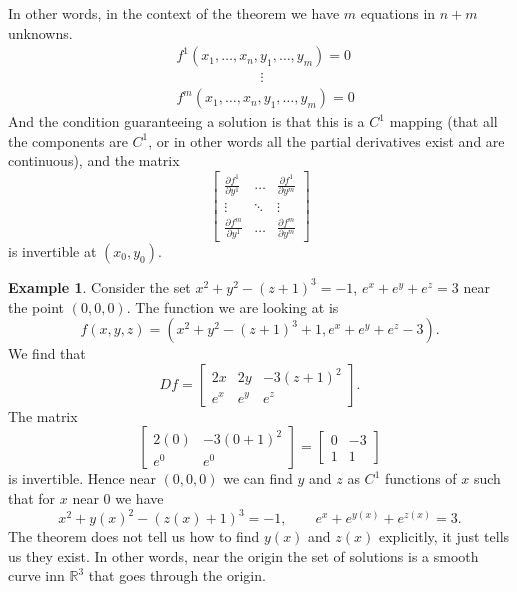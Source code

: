 \documentclass[12pt]{book}
\newcommand{\R}{{\mathbb{R}}}
\theoremstyle{plain}
\theoremstyle{remark}
\theoremstyle{definition}
\theoremstyle{exercise}
\theoremstyle{example}
\newtheorem{example}[thm]{Example}
\begin{document}
In other words, in the context of the theorem we have
$m$ equations in $n+m$ unknowns.
\begin{align*}
& f^1 (x_1,\ldots,x_n,y_1,\ldots,y_m) = 0 \\
& \qquad \qquad \qquad  \vdots \\
& f^m (x_1,\ldots,x_n,y_1,\ldots,y_m) = 0
\end{align*}
And the condition guaranteeing a solution is that this is a $C^1$ mapping (that all the components are
$C^1$, or in other words all the partial derivatives exist
and are continuous), and the matrix
\begin{equation*}
\begin{bmatrix}
\frac{\partial f^1}{\partial y^1}
& \ldots &
\frac{\partial f^1}{\partial y^m}
\\
\vdots & \ddots & \vdots
\\
\frac{\partial f^m}{\partial y^1}
& \ldots &
\frac{\partial f^m}{\partial y^m}
\end{bmatrix}
\end{equation*}
is invertible at $(x_0,y_0)$.

\begin{example}
Consider the set $x^2+y^2-{(z+1)}^3 = -1$, $e^x+e^y+e^z = 3$
near the point $(0,0,0)$.
The function we are looking at is
\begin{equation*}
f(x,y,z) = (x^2+y^2-{(z+1)}^3+1,e^x+e^y+e^z-3) .
\end{equation*}
We find that
\begin{equation*}
Df =
\begin{bmatrix}
2x & 2y & -3{(z+1)}^2 \\
e^x & e^y & e^z
\end{bmatrix} .
\end{equation*}
The matrix
\begin{equation*}
\begin{bmatrix}
2(0) & -3{(0+1)}^2 \\
e^0 & e^0
\end{bmatrix}
=
\begin{bmatrix}
0 & -3 \\
1 & 1
\end{bmatrix}
\end{equation*}
is invertible.  Hence near $(0,0,0)$ we can find $y$ and $z$
as $C^1$ functions of $x$ such that for $x$ near 0 we have
\begin{equation*}
x^2+y(x)^2-{(z(x)+1)}^3 = -1,
\qquad
e^x+e^{y(x)}+e^{z(x)} = 3 .
\end{equation*}
The theorem does not tell us how to find $y(x)$ and $z(x)$ explicitly,
it just tells us they exist.
In other words, near the origin the set of solutions is a
smooth curve inn $\R^3$ that goes through the origin.
\end{example}
\end{document}
